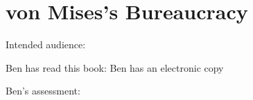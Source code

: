 \section{von Mises's Bureaucracy\label{review:vonMises_bur}}

\cite{1996_Mises}

Intended audience:

Ben has read this book: Ben has an electronic copy

Ben's assessment: 


